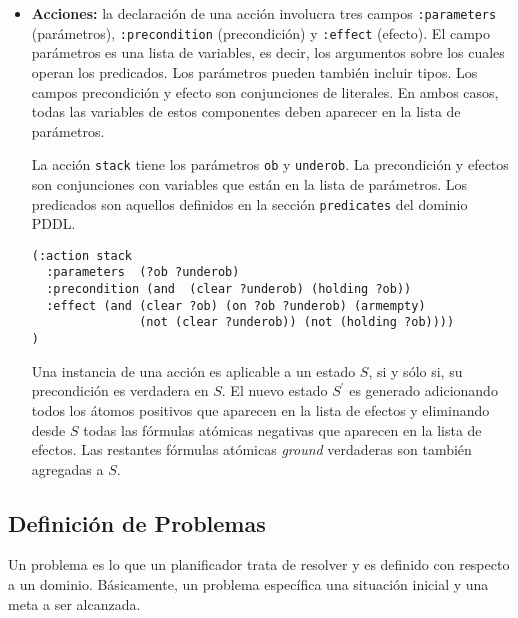 \begin{itemize}
\begin{ejemplo}
\end{ejemplo} 

\item {\bf Acciones:} la declaraci\'on de una acci\'on involucra tres campos 
\texttt{:parameters} (par\'ametros), 
\texttt{:precondition} (precondici\'on) y \texttt{:effect} (efecto). 
El campo par\'ametros es una lista de variables, es decir, los argumentos 
sobre los cuales operan los predicados. Los par\'ametros pueden
tambi\'en incluir tipos. 
Los campos precondici\'on y efecto son conjunciones de li\-te\-ra\-les. 
En ambos casos, todas las variables de estos componentes 
deben aparecer en la lista de par\'ametros.

\begin{ejemplo}

La acci\'on \texttt{stack} tiene los par\'ametros \texttt{ob}
y \texttt{underob}. La precondici\'on y efectos son conjunciones con
variables que est\'an en la lista de par\'ametros. Los predicados son
aquellos definidos en la secci\'on \texttt{predicates} del dominio PDDL.

 \begin{verbatim}
(:action stack
  :parameters  (?ob ?underob)
  :precondition (and  (clear ?underob) (holding ?ob))
  :effect (and (clear ?ob) (on ?ob ?underob) (armempty)
               (not (clear ?underob)) (not (holding ?ob))))
)
 \end{verbatim}
\end{ejemplo}

Una instancia de una acci\'on es aplicable a un estado \emph{$S$}, 
si y s\'olo si, su precondici\'on es verdadera en \emph{$S$}. 
El nuevo estado \emph{$S^{'}$} es generado adicionando todos los \'atomos 
positivos que aparecen en la lista de efectos y eliminando desde \emph{$S$} 
todas las f\'ormulas at\'omicas negativas que aparecen en la lista de efectos.
Las restantes f\'ormulas at\'omicas \emph{ground} verdaderas son tambi\'en
agregadas a \emph{$S$}.



\end{itemize} 
 

\subsection{Definici\'on de Problemas}

Un problema es lo que un planificador trata de resolver 
y es definido con respecto a un dominio. B\'asicamente, un problema espec\'ifica 
una situaci\'on inicial y una meta a ser alcanzada. 

